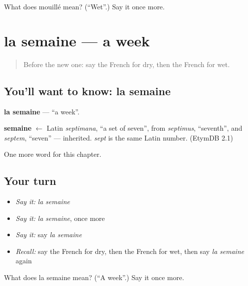 \begin{tcolorbox}[breakable,colback=teal!4,colframe=teal!35!black,title={Before you move on}]
What does mouillé mean? (\textquotedblleft{}Wet\textquotedblright{}.) Say it once more.
\end{tcolorbox}
\section[la semaine]{la semaine — a week}

\label{lesson:FR-C95-semaine}



\begin{quote}
Before the new one: say the French for dry, then the French for wet.
\end{quote}

\subsection*{You'll want to know: la semaine}
\textbf{la semaine} — \textquotedblleft{}a week\textquotedblright{}.

\begin{cousinweb}
\textbf{semaine} $\leftarrow$ Latin \emph{septimana}, \textquotedblleft{}a set of seven\textquotedblright{}, from \emph{septimus}, \textquotedblleft{}seventh\textquotedblright{}, and \emph{septem}, \textquotedblleft{}seven\textquotedblright{} — inherited. \emph{sept} is the same Latin number. (EtymDB 2.1)
\end{cousinweb}

\begin{grammarlens}[title={What you've built}]
One more word for this chapter.
\end{grammarlens}

\subsection*{Your turn}
\begin{itemize}
\raggedright
  \item \emph{Say it:} \emph{la semaine}
  \item \emph{Say it:} \emph{la semaine}, once more
  \item \emph{Say it:} say \emph{la semaine}
  \item \emph{Recall:} say the French for dry, then the French for wet, then say \emph{la semaine} again
\end{itemize}

\begin{tcolorbox}[breakable,colback=teal!4,colframe=teal!35!black,title={Before you move on}]
What does la semaine mean? (\textquotedblleft{}A week\textquotedblright{}.) Say it once more.
\end{tcolorbox}
